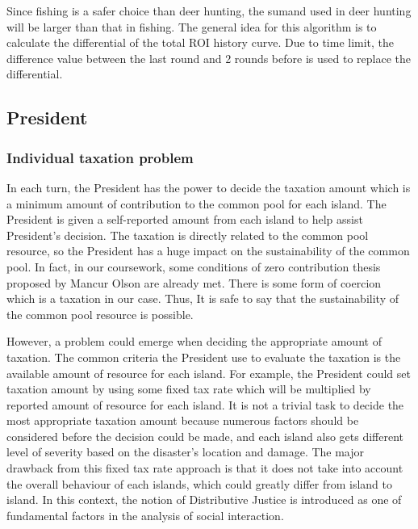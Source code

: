 Since fishing is a safer choice than deer hunting, the sumand used in deer hunting will be larger than that in fishing. The general idea for this algorithm is to calculate the differential of the total ROI history curve. Due to time limit, the difference value between the last round and 2 rounds before is used to replace the differential.

\subsection{President} \label{subsec:Team6_President}
\subsubsection{Individual taxation problem} \label{subsubsec:Team6_President:Dilemma}
In each turn, the President has the power to decide the taxation amount which is a minimum amount of contribution to the common pool for each island. The President is given a self-reported amount from each island to help assist President’s decision. The taxation is directly related to the common pool resource, so the President has a huge impact on the sustainability of the common pool. In fact, in our coursework, some conditions of zero contribution thesis proposed by Mancur Olson are already met. There is some form of coercion which is a taxation in our case. Thus, It is safe to say that the sustainability of the common pool resource is possible.

However, a problem could emerge when deciding the appropriate amount of taxation. The common criteria the President use to evaluate the taxation is the available amount of resource for each island. For example, the President could set taxation amount by using some fixed tax rate which will be multiplied by reported amount of resource for each island. It is not a trivial task to decide the most appropriate taxation amount because numerous factors should be considered before the decision could be made, and each island also gets different level of severity based on the disaster’s location and damage. The major drawback from this fixed tax rate approach is that it does not take into account the overall behaviour of each islands, which could greatly differ from island to island. In this context, the notion of Distributive Justice is introduced as one of fundamental factors in the analysis of social interaction.

